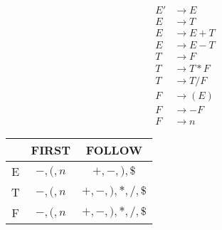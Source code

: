\documentclass[12pt]{article}
\begin{document}
\begin{align}
	E'&\to E    \\
	E &\to T    \\
	E &\to E+T  \\
	E &\to E-T  \\
	T &\to F    \\
	T &\to T*F  \\
	T &\to T/F  \\
	F &\to (E)  \\
	F &\to -F   \\
	F &\to n 
\end{align}

\begin{center}
	\begin{tabular}{ c | c | c }
			&   FIRST   &       FOLLOW      \\  \hline\hline
		E   & \(-,(,n\) &   \(+,-,),\$\)    \\  \hline
		T   & \(-,(,n\) &\(+,-,),*,/,\$\)   \\  \hline
		F   & \(-,(,n\) &\(+,-,),*,/,\$\)
	\end{tabular}
\end{center}
\end{document}
